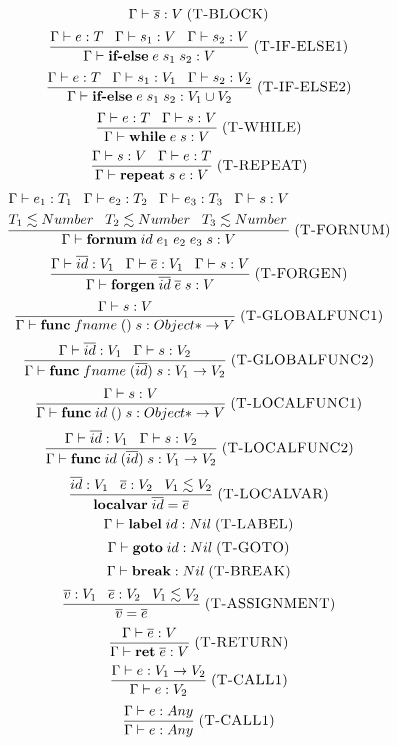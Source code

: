 \documentclass[12pt]{article}
\newcommand{\mylabel}[1]{\; (\textsc{#1})}
\newcommand{\env}{\Gamma}
\begin{document}
\[
\env \vdash \overline{s} : V
\mylabel{T-BLOCK}
\]
\[
\frac{\env \vdash e:T \;\;\; \env \vdash s_{1}:V \;\;\; \env \vdash s_{2}:V}
     {\env \vdash \textbf{if-else} \; e \; s_{1} \; s_{2} : V}
\mylabel{T-IF-ELSE1}
\]
\[
\frac{\env \vdash e:T \;\;\;
      \env \vdash s_{1}:V_{1} \;\;\; \env \vdash s_{2}:V_{2}}
     {\env \vdash \textbf{if-else} \; e \; s_{1} \; s_{2} : V_{1} \cup V_{2}}
\mylabel{T-IF-ELSE2}
\]
\[
\frac{\env \vdash e:T \;\;\; \env \vdash s:V}
     {\env \vdash \textbf{while} \; e \; s : V}
\mylabel{T-WHILE}
\]
\[
\frac{\env \vdash s:V \;\;\; \env \vdash e:T}
     {\env \vdash \textbf{repeat} \; s \; e : V}
\mylabel{T-REPEAT}
\]
\[
\frac{\begin{aligned}
      & \env \vdash e_{1}:T_{1} \;\;\; \env \vdash e_{2}:T_{2} \;\;\;
      \env \vdash e_{3}:T_{3} \;\;\; \env \vdash s:V\\
      & T_{1} \lesssim Number \;\;\;
      T_{2} \lesssim Number \;\;\;
      T_{3} \lesssim Number
      \end{aligned}}
     {\env \vdash \textbf{fornum} \; id \; e_{1} \; e_{2} \; e_{3} \; s : V}
\mylabel{T-FORNUM}
\]
\[
\frac{\env \vdash \overline{id}:V_{1} \;\;\; \env \vdash \overline{e}:V_{1}
      \;\;\; \env \vdash s:V}
     {\env \vdash \textbf{forgen} \; \overline{id} \; \overline{e} \; s : V}
\mylabel{T-FORGEN}
\]
\[
\frac{\env \vdash s:V}
     {\env \vdash \mathbf{func} \; fname \; () \; s : {Object*} \rightarrow V}
\mylabel{T-GLOBALFUNC1}
\]
\[
\frac{\env \vdash \overline{id}:V_{1} \;\;\; \env \vdash s:V_{2}}
     {\env \vdash \mathbf{func} \; fname \; (\overline{id}) \; s :
     {V_{1}} \rightarrow V_{2}}
\mylabel{T-GLOBALFUNC2}
\]
\[
\frac{\env \vdash s:V}
     {\env \vdash \mathbf{func} \; id \; () \; s : {Object*} \rightarrow V}
\mylabel{T-LOCALFUNC1}
\]
\[
\frac{\env \vdash \overline{id}:V_{1} \;\;\; \env \vdash s:V_{2}}
     {\env \vdash \mathbf{func} \; id \; (\overline{id}) \; s :
     {V_{1}} \rightarrow V_{2}}
\mylabel{T-LOCALFUNC2}
\]
\[
\frac{\overline{id}:V_{1} \;\;\; \overline{e}:V_2 \;\;\; V_{1} \lesssim V_{2}}
     {\textbf{localvar} \; \overline{id} = \overline{e}}
\mylabel{T-LOCALVAR}
\]
\[
\env \vdash \textbf{label} \; id : Nil
\mylabel{T-LABEL}
\]
\[
\env \vdash \textbf{goto} \; id : Nil
\mylabel{T-GOTO}
\]
\[
\env \vdash \textbf{break} : Nil
\mylabel{T-BREAK}
\]
\[
\frac{\overline{v}:V_{1} \;\;\; \overline{e}:V_2 \;\;\; V_{1} \lesssim V_{2}}
     {\overline{v} = \overline{e}}
\mylabel{T-ASSIGNMENT}
\]
\[
\frac{\env \vdash \overline{e}:V}
     {\env \vdash \textbf{ret} \; \overline{e} : V}
\mylabel{T-RETURN}
\]
\[
\frac{\env \vdash e:V_{1} \rightarrow V_{2}}
     {\env \vdash e : V_{2}}
\mylabel{T-CALL1}
\]
\[
\frac{\env \vdash e:Any}
     {\env \vdash e : Any}
\mylabel{T-CALL1}
\]
\end{document}
